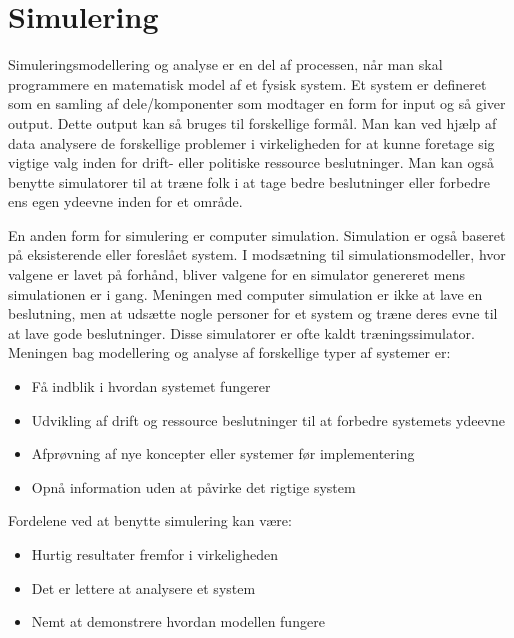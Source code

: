 \chapter{Simulering}\label{Simulering}

Simuleringsmodellering og analyse er en del af processen, når man skal programmere en matematisk model af et fysisk system. Et system er defineret som en samling af dele/komponenter som modtager en form for input og så giver output. Dette output kan så bruges til forskellige formål. Man kan ved hjælp af data analysere de forskellige problemer i virkeligheden for at kunne foretage sig vigtige valg inden for drift- eller politiske ressource beslutninger. Man kan også benytte simulatorer til at træne folk i at tage bedre beslutninger eller forbedre ens egen ydeevne inden for et område. \cite[s. 16-20]{SimulationHandbook}

\vspace{5mm}

En anden form for simulering er computer simulation. Simulation er også baseret på eksisterende eller foreslået system. I modsætning til simulationsmodeller, hvor valgene er lavet på forhånd, bliver valgene for en simulator genereret mens simulationen er i gang. Meningen med computer simulation er ikke at lave en beslutning, men at udsætte nogle personer for et system og træne deres evne til at lave gode beslutninger. Disse simulatorer er ofte kaldt træningssimulator. Meningen bag modellering og analyse af forskellige typer af systemer er:

\begin{itemize}
\item Få indblik i hvordan systemet fungerer
\item Udvikling af drift og ressource beslutninger til at forbedre systemets ydeevne
\item Afprøvning af nye koncepter eller systemer før implementering
\item Opnå information uden at påvirke det rigtige system
\end{itemize}

\vspace{5mm}

Fordelene ved at benytte simulering kan være:
\begin{itemize}
\item Hurtig resultater fremfor i virkeligheden
\item Det er lettere at analysere et system
\item Nemt at demonstrere hvordan modellen fungere
\end{itemize}

